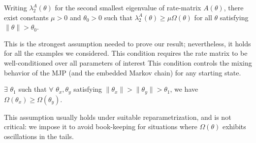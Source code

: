 \begin{assumption}
	Writing $\lambda ^A_2(\theta)$ for the second smallest eigenvalue of
    rate-matrix  $A(\theta)$, there exist constants $\mu > 0$ and $\theta_0 > 0$
    such that $ \lambda ^A_2(\theta) \geq \mu \Omega(\theta)$
   for all $\theta$ satisfying $ \parallel \theta \parallel> \theta_0$.
  \label{asmp:cond_num}
\end{assumption}
\noindent This is the strongest assumption needed to prove our result;
nevertheless, it holds for all the examples we considered. This condition requires the rate
matrix to be well-conditioned over all parameters of interest This condition controls the
mixing behavior of the MJP (and the embedded Markov chain) for any
starting state.

\begin{assumption}
  $\exists$ $\theta_1$ such that $\forall$ $\theta_x, \theta_y$ satisfying
  $\parallel \theta_x \parallel > \parallel \theta_y \parallel > \theta_1$, we
  have $\Omega(\theta_x) \ge \Omega(\theta_y)$.
  \label{asmp:mono_tail}
\end{assumption}
\noindent This assumption usually holds under suitable reparametrization,
and is not critical: we impose it to avoid book-keeping for
situations where $\Omega(\theta)$ exhibits oscillations in the tails.

